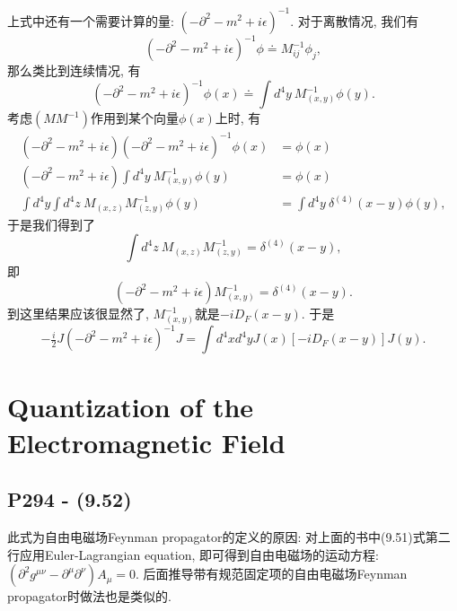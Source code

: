 {  上式中还有一个需要计算的量: $(-\partial^2-m^2+i\epsilon)^{-1}$. 对于离散情况, 我们有
  \begin{equation}
    (-\partial^2-m^2+i\epsilon)^{-1}\phi \doteq M^{-1}_{ij}\phi_j,
  \end{equation}
  那么类比到连续情况, 有
  \begin{equation}
    (-\partial^2-m^2+i\epsilon)^{-1}\phi(x) \doteq \int d^4y\ M^{-1}_{(x,y)}\phi(y).
  \end{equation}
  考虑$(MM^{-1})$作用到某个向量$\phi(x)$上时, 有
  \begin{equation}
    \begin{aligned}
      (-\partial^2-m^2+i\epsilon)(-\partial^2-m^2+i\epsilon)^{-1}\phi(x) & = \phi(x)                              \\
      (-\partial^2-m^2+i\epsilon) \int d^4y\ M^{-1}_{(x,y)}\phi(y)       & = \phi(x)                              \\
      \int d^4y \int d^4z\ M_{(x,z)}M^{-1}_{(z,y)}\phi(y)                & = \int d^4y\ \delta^{(4)}(x-y)\phi(y),
    \end{aligned}
  \end{equation}
  于是我们得到了
  \begin{equation}
    \int d^4z\ M_{(x,z)}M^{-1}_{(z,y)} = \delta^{(4)} (x-y),
  \end{equation}
  即
  \begin{equation}
    (-\partial^2-m^2+i\epsilon)M^{-1}_{(x,y)} = \delta^{(4)} (x-y).
  \end{equation}
  到这里结果应该很显然了, $M^{-1}_{(x,y)}$就是$-iD_F(x-y)$. 于是
  \begin{equation}
    -\tfrac{i}{2}J(-\partial^2-m^2+i\epsilon)^{-1}J = \int d^4x d^4y J(x)[-iD_F(x-y)] J(y).
  \end{equation}
}

\setcounter{section}{3}

\section{Quantization of the Electromagnetic Field}

\subsection{P294 - (9.52)}

此式为自由电磁场Feynman propagator的定义的原因: 对上面的书中(9.51)式第二行应用Euler-Lagrangian equation, 即可得到自由电磁场的运动方程: $(\partial^2 g^{\mu\nu} - \partial^\mu \partial^\nu)A_\mu  = 0$. 后面推导带有规范固定项的自由电磁场Feynman propagator时做法也是类似的.

